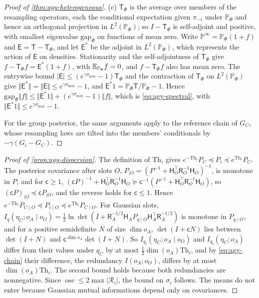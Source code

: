 \begin{proof}[Proof of \cref{thm:agy-heterogeneous}]
(c) $\mathsf T_\Phi$ is the average over members of the resampling operators, each the conditional expectation given $\pi_{-i}$ under $\mathbb P_\Phi$ and hence an orthogonal projection in $L^2(\mathbb P_\Phi)$; so $I-\mathsf T_\Phi$ is self-adjoint and positive, with smallest eigenvalue $\mathrm{gap}_\Phi$ on functions of mean zero. Write $\mathbb P^\infty=\mathbb P_\Phi(1+f)$ and $\mathsf E=\mathsf T-\mathsf T_\Phi$, and let $\mathsf E^\ast$ be the adjoint in $L^2(\mathbb P_\Phi)$, which represents the action of $\mathsf E$ on densities. Stationarity and the self-adjointness of $\mathsf T_\Phi$ give $f-\mathsf T_\Phi f=\mathsf E^\ast(1+f)$, with $\mathbb{E}_{\mathbb P_\Phi}f=0$, and $f-\mathsf T_\Phi f$ also has mean zero. The entrywise bound $\lvert\mathsf E\rvert\le(e^{\gamma\sigma_{\max}}-1)\mathsf T_\Phi$ and the contraction of $\mathsf T_\Phi$ on $L^2(\mathbb P_\Phi)$ give $\Vert\mathsf E^\ast\Vert=\Vert\mathsf E\Vert\le e^{\gamma\sigma_{\max}}-1$, and $\mathsf E^\ast1=\mathbb P_\Phi\mathsf T/\mathbb P_\Phi-1$. Hence $\mathrm{gap}_\Phi\Vert f\Vert\le\Vert\mathsf E^\ast1\Vert+(e^{\gamma\sigma_{\max}}-1)\Vert f\Vert$, which is \eqref{eq:agy-spectral}, with $\Vert\mathsf E^\ast1\Vert\le e^{\gamma\sigma_{\max}}-1$.

For the group posterior, the same arguments apply to the reference chain of $G_C$, whose resampling laws are tilted into the members' conditionals by $-\gamma(G_i-G_C)$.
\end{proof}

\begin{proof}[Proof of \cref{prop:agy-dispersion}]
The definition of $\mathrm{Th}_i$ gives $e^{-\mathrm{Th}_i}P_C\preceq P_i\preceq e^{\mathrm{Th}_i}P_C$. The posterior covariance after slots $O$, $P_{\mid O}=(P^{-1}+\mathsf H_O^\top\mathsf R_O^{-1}\mathsf H_O)^{-1}$, is monotone in $P$, and for $\mathsf c\ge1$, $(\mathsf cP)^{-1}+\mathsf H_O^\top\mathsf R_O^{-1}\mathsf H_O\succeq\mathsf c^{-1}(P^{-1}+\mathsf H_O^\top\mathsf R_O^{-1}\mathsf H_O)$, so $(\mathsf cP)_{\mid O}\preceq\mathsf cP_{\mid O}$, and the reverse holds for $\mathsf c\le1$. Hence $e^{-\mathrm{Th}_i}P_{C\mid O}\preceq P_{i\mid O}\preceq e^{\mathrm{Th}_i}P_{C\mid O}$. For Gaussian slots, $I_q(\eta_C;o_A\mid o_O)=\frac12\ln\det(I+\mathsf R_A^{-1/2}\mathsf H_AP_{q\mid O}\mathsf H_A^\top\mathsf R_A^{-1/2})$ is monotone in $P_{q\mid O}$, and for a positive semidefinite $N$ of size $\dim o_A$, $\det(I+\mathsf cN)$ lies between $\det(I+N)$ and $\mathsf c^{\dim o_A}\det(I+N)$. So $I_{q_i}(\eta_C;o_A\mid o_O)$ and $I_{q_i}(\eta_C;o_A)$ differ from their values under $q_C$ by at most $\frac12\dim(o_A)\mathrm{Th}_i$, and by \eqref{eq:agy-chain} their difference, the redundancy $I(o_A;o_O)$, differs by at most $\dim(o_A)\mathrm{Th}_i$. The second bound holds because both redundancies are nonnegative. Since $\operatorname{osc}\le2\max\lvert\mathcal R_i\rvert$, the bound on $\sigma_i$ follows. The means do not enter because Gaussian mutual informations depend only on covariances.
\end{proof}

